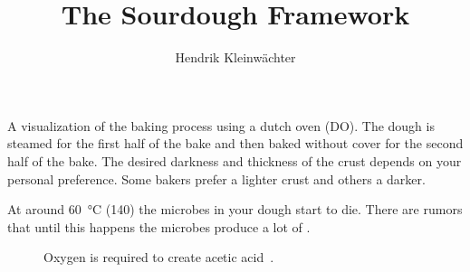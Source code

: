 \documentclass[paper=a4, twoside=false, fontsize=12pt, parskip=half,
                bibliography=totoc, listof=totoc]{scrbook}
\author{Hendrik Kleinwächter}
\title{The Sourdough Framework}
\begin{document}

\titlepage

{%
\hypersetup{hidelinks}
\ifdefined\HCode\else\tableofcontents\fi
}




\begin{flowchart}[!htb]
\begin{center}
  
  \caption[Baking process with a dutch oven]{A visualization of the baking
      process using a dutch oven (DO). The dough is steamed for the first half
      of the bake and then baked without cover for the second half of the
      bake. The desired darkness and thickness of the crust depends on your
      personal preference. Some bakers prefer a lighter crust and others a
      darker.}%
  \label{fig:dutch-oven-process}
\end{center}
\end{flowchart}

At around  \qty{60}{\degreeCelsius} (\qty{140}{\degF}) the microbes in your
dough start to die.  There are rumors that until this happens the microbes
produce a lot of .

\begin{figure}[!htb]
\begin{center}
  
  \caption[Acetic acid creation]{Oxygen is required to create acetic
      acid~\cite{acetic+acid+production}.}%
  \label{fig:ethanol-oxidation}
\end{center}
\end{figure}

%
%  
%
%
\end{document}
